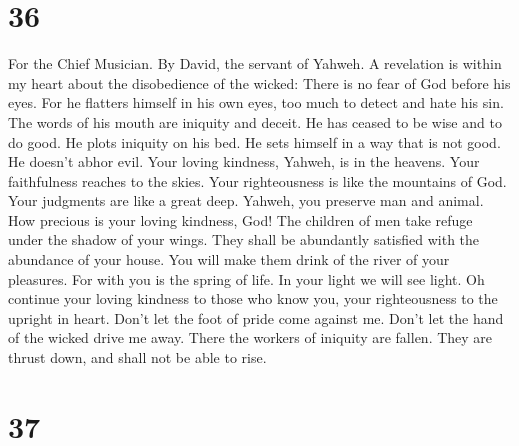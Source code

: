 \hypertarget{section-35}{%
\section{36}\label{section-35}}

For the Chief Musician. By David, the servant of Yahweh.  A
revelation is within my heart about the disobedience of the wicked:
There is no fear of God before his eyes.  For he flatters
himself in his own eyes, too much to detect and hate his sin.
 The words of his mouth are iniquity and deceit. He has
ceased to be wise and to do good.  He plots iniquity on his
bed. He sets himself in a way that is not good. He doesn't abhor evil.
 Your loving kindness, Yahweh, is in the heavens. Your
faithfulness reaches to the skies.  Your righteousness is
like the mountains of God. Your judgments are like a great deep. Yahweh,
you preserve man and animal.  How precious is your loving
kindness, God! The children of men take refuge under the shadow of your
wings.  They shall be abundantly satisfied with the
abundance of your house. You will make them drink of the river of your
pleasures.  For with you is the spring of life. In your
light we will see light.  Oh continue your loving kindness
to those who know you, your righteousness to the upright in heart.
 Don't let the foot of pride come against me. Don't let the
hand of the wicked drive me away.  There the workers of
iniquity are fallen. They are thrust down, and shall not be able to
rise.

\hypertarget{section-36}{%
\section{37}\label{section-36}}

